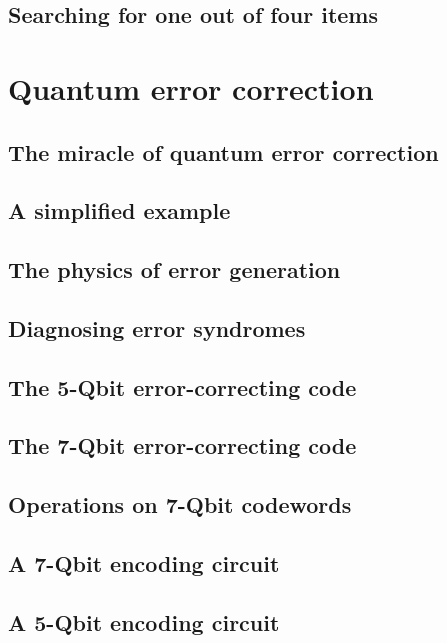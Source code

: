 \documentclass{book}
\theoremstyle{definition}
\begin{document}
\subsection{Searching for one out of four items}


\newpage

\section{Quantum error correction}

\subsection{The miracle of quantum error correction}
\subsection{A simplified example}
\subsection{The physics of error generation}
\subsection{Diagnosing error syndromes}
\subsection{The 5-Qbit error-correcting code}
\subsection{The 7-Qbit error-correcting code}
\subsection{Operations on 7-Qbit codewords}
\subsection{A 7-Qbit encoding circuit}
\subsection{A 5-Qbit encoding circuit}

\newpage
\end{document}
